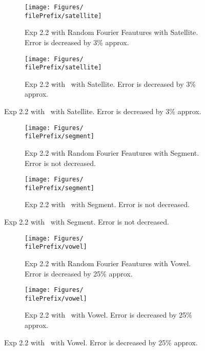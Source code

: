 \begin{figure}[H]
  \centering
  \renewcommand{\filePrefix}{\undPrefix/rff}
  \begin{subfigure}[t]{0.5\linewidth}
    \centering\captionsetup{width=.8\linewidth}\texttt{[image: Figures/\\filePrefix/satellite]}
    \caption{Exp 2.2 with Random Fourier Feautures with Satellite. Error is decreased by 3\% approx.}
    \label{fig:\undPrefix_satellite}
  \end{subfigure}%
  \renewcommand{\filePrefix}{\undPrefix/nys}%
  \begin{subfigure}[t]{0.5\linewidth}
    \centering\captionsetup{width=.8\linewidth}\texttt{[image: Figures/\\filePrefix/satellite]}
    \caption{Exp 2.2 with \Nys\ with Satellite. Error is decreased by 3\% approx.}
  \end{subfigure}
\end{figure}


\begin{figure}[H]
  \centering
  \renewcommand{\filePrefix}{\undPrefix/rff}
  \begin{subfigure}[t]{0.5\linewidth}
    \centering\captionsetup{width=.8\linewidth}\texttt{[image: Figures/\\filePrefix/segment]}
    \caption{Exp 2.2 with Random Fourier Feautures with Segment. Error is not decreased.}
    \label{fig:\undPrefix_segment}
  \end{subfigure}%
  \renewcommand{\filePrefix}{\undPrefix/nys}%
  \begin{subfigure}[t]{0.5\linewidth}
    \centering\captionsetup{width=.8\linewidth}\texttt{[image: Figures/\\filePrefix/segment]}
    \caption{Exp 2.2 with \Nys\ with Segment. Error is not decreased.}
  \end{subfigure}%
\end{figure}


\begin{figure}[H]
  \centering
  \renewcommand{\filePrefix}{\undPrefix/rff}
  \begin{subfigure}[t]{0.5\linewidth}
    \centering\captionsetup{width=.8\linewidth}\texttt{[image: Figures/\\filePrefix/vowel]}
    \caption{Exp 2.2 with Random Fourier Feautures with Vowel. Error is decreased by 25\% approx.}
    \label{fig:\undPrefix_vowel}
  \end{subfigure}%
  \renewcommand{\filePrefix}{\undPrefix/nys}%
  \begin{subfigure}[t]{0.5\linewidth}
    \centering\captionsetup{width=.8\linewidth}\texttt{[image: Figures/\\filePrefix/vowel]}
    \caption{Exp 2.2 with \Nys\ with Vowel. Error is decreased by 25\% approx.}
    \label{fig:\undPrefix_vowel}
  \end{subfigure}
\end{figure}





